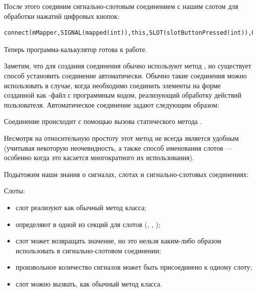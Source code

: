 После этого соединим  сигнально-слотовым соединением с нашим слотом для обработки
нажатий цифровых кнопок:
\begin{lstlisting}
connect(mMapper,SIGNAL(mapped(int)),this,SLOT(slotButtonPressed(int)),Qt::UniqueConnection);
\end{lstlisting}

Теперь программа-калькулятор готова к работе.

Заметим, что для создания соединения обычно используют метод , но существует способ установить
соединение автоматически. Обычно такие соединения можно
использовать в случае, когда необходимо соединить элементы на форме созданной как -файл с программным кодом,
реализующий обработку действий пользователя. Автоматическое соединение задают следующим образом:

Соединение происходит с помощью вызова статического метода .

Несмотря на относительную простоту этот метод не всегда является удобным (учитывая некоторую неочевидность, а также
способ именования слотов --- особенно когда это касается многократного их использования).

Подытожим наши знания о сигналах, слотах и сигнально-слотовых соединениях:

Слоты:
\begin{itemize}
\item слот реализуют как обычный метод класса;
\item определяют в одной из секций для слотов (, , );
\item слот может возвращать значение, но это нельзя каким-либо образом использовать в сигнально-слотовом соединении;
\item произвольное количество сигналов может быть присоединено к одному слоту;
\item слот можно вызвать, как обычный метод класса.
\end{itemize}

